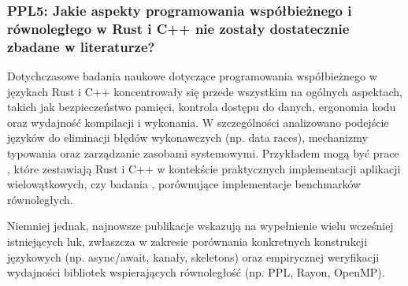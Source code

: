 \subsubsection{PPL5: Jakie aspekty programowania współbieżnego i równoległego w Rust i C++ nie zostały dostatecznie zbadane w literaturze?}
Dotychczasowe badania naukowe dotyczące programowania współbieżnego w językach Rust i C++ koncentrowały się przede wszystkim na ogólnych aspektach, takich jak bezpieczeństwo pamięci, kontrola dostępu do danych, ergonomia kodu oraz wydajność kompilacji i wykonania. W szczególności analizowano podejście języków do eliminacji błędów wykonawczych (np. data races), mechanizmy typowania oraz zarządzanie zasobami systemowymi. Przykładem mogą być prace \cite{heyman2020comparison}, które zestawiają Rust i C++ w kontekście praktycznych implementacji aplikacji wielowątkowych, czy badania \cite{martins2025npbrustnasparallelbenchmarks}, porównujące implementacje benchmarków równoległych.

Niemniej jednak, najnowsze publikacje wskazują na wypełnienie wielu wcześniej istniejących luk, zwłaszcza w zakresie porównania konkretnych konstrukcji językowych (np. async/await, kanały, skeletons) oraz empirycznej weryfikacji wydajności bibliotek wspierających równoległość (np. PPL, Rayon, OpenMP).

